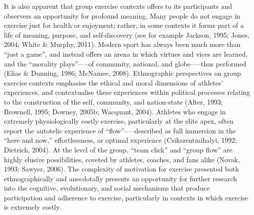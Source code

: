It is also apparent that group exercise contexts offers to its participants and observers an opportunity for profound meaning.  Many people do not engage in exercise just for health or enjoyment; rather, in some contexts it forms part of a life of meaning, purpose, and self-discovery (see for example Jackson, 1995; Jones, 2004; White \& Murphy, 2011). Modern sport has always been much more than ``just a game'', and instead offers an arena in which virtues and vices are learned, and the ``morality plays''—--of community, national, and globe—--thus performed (Elias \& Dunning, 1986; McNamee, 2008).  Ethnographic perspectives on group exercise contexts emphasise the ethical and moral dimensions of athletes’ experiences, and contextualise these experiences within political processes relating to the construction of the self, community, and nation-state (Alter, 1993; Brownell, 1995; Downey, 2005b; Wacquant, 2004).  Athletes who engage in extremely physiologically costly exercise, particularly at the elite apex, often report the autotelic experience of ``flow''—--described as full immersion in the ``here and now,'' effortlessness, or optimal experience (Csikszentmihalyi, 1992; Dietrich, 2004).  At the level of the group, ``team click'' and ``group flow'' are highly elusive possibilities, coveted by athletes, coaches, and fans alike (Novak, 1993; Sawyer, 2006).  The complexity of motivation for exercise presented both ethnographically and anecdotally presents an opportunity for further research into the cognitive, evolutionary, and social mechanisms that produce participation and adherence to exercise, particularly in contexts in which exercise is extremely costly.


